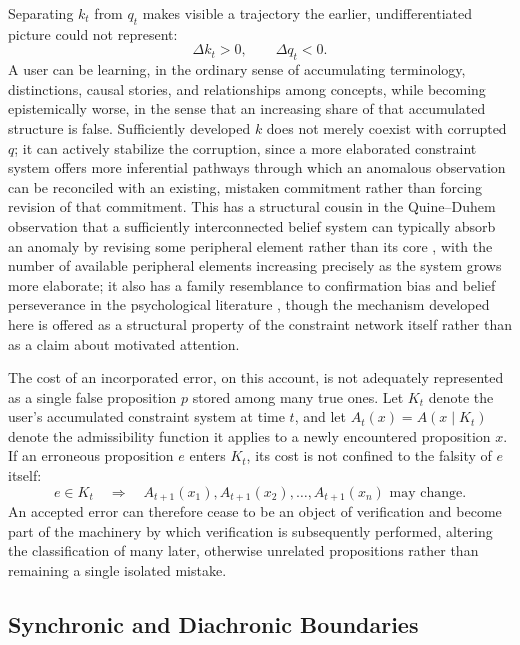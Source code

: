 \documentclass[11pt]{article}
\begin{document}
Separating $k_t$ from $q_t$ makes visible a trajectory the earlier, undifferentiated picture could not represent:
\[
\Delta k_t > 0, \qquad \Delta q_t < 0.
\]
A user can be learning, in the ordinary sense of accumulating terminology, distinctions, causal stories, and relationships among concepts, while becoming epistemically worse, in the sense that an increasing share of that accumulated structure is false. Sufficiently developed $k$ does not merely coexist with corrupted $q$; it can actively stabilize the corruption, since a more elaborated constraint system offers more inferential pathways through which an anomalous observation can be reconciled with an existing, mistaken commitment rather than forcing revision of that commitment. This has a structural cousin in the Quine--Duhem observation that a sufficiently interconnected belief system can typically absorb an anomaly by revising some peripheral element rather than its core \cite{quine1951,duhem1906}, with the number of available peripheral elements increasing precisely as the system grows more elaborate; it also has a family resemblance to confirmation bias and belief perseverance in the psychological literature \cite{nickerson1998,anderson1980}, though the mechanism developed here is offered as a structural property of the constraint network itself rather than as a claim about motivated attention.

The cost of an incorporated error, on this account, is not adequately represented as a single false proposition $p$ stored among many true ones. Let $K_t$ denote the user's accumulated constraint system at time $t$, and let $A_{t}(x) = A(x \mid K_t)$ denote the admissibility function it applies to a newly encountered proposition $x$. If an erroneous proposition $e$ enters $K_t$, its cost is not confined to the falsity of $e$ itself:
\[
e \in K_t \quad \Rightarrow \quad A_{t+1}(x_1), A_{t+1}(x_2), \ldots, A_{t+1}(x_n) \text{ may change.}
\]
An accepted error can therefore cease to be an object of verification and become part of the machinery by which verification is subsequently performed, altering the classification of many later, otherwise unrelated propositions rather than remaining a single isolated mistake.

\subsection{Synchronic and Diachronic Boundaries}
\end{document}
